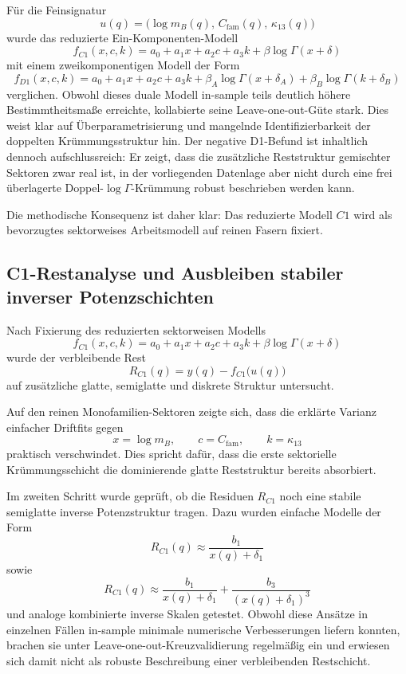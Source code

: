 \documentclass[11pt,a4paper]{article}
\theoremstyle{definition}
\theoremstyle{remark}
\begin{document}
Für die Feinsignatur
\[
u(q)=\bigl(\log m_B(q),\,C_{\mathrm{fam}}(q),\,\kappa_{13}(q)\bigr)
\]
wurde das reduzierte Ein-Komponenten-Modell
\[
f_{C1}(x,c,k)
=
a_0+a_1x+a_2c+a_3k+\beta\log\Gamma(x+\delta)
\]
mit einem zweikomponentigen Modell der Form
\[
f_{D1}(x,c,k)
=
a_0+a_1x+a_2c+a_3k
+\beta_A\log\Gamma(x+\delta_A)
+\beta_B\log\Gamma(k+\delta_B)
\]
verglichen. Obwohl dieses duale Modell in-sample teils deutlich höhere Bestimmtheitsmaße erreichte, kollabierte seine Leave-one-out-Güte stark. Dies weist klar auf Überparametrisierung und mangelnde Identifizierbarkeit der doppelten Krümmungsstruktur hin. Der negative D1-Befund ist inhaltlich dennoch aufschlussreich: Er zeigt, dass die zusätzliche Reststruktur gemischter Sektoren zwar real ist, in der vorliegenden Datenlage aber nicht durch eine frei überlagerte Doppel-\(\log\Gamma\)-Krümmung robust beschrieben werden kann.

Die methodische Konsequenz ist daher klar: Das reduzierte Modell \(C1\) wird als bevorzugtes sektorweises Arbeitsmodell auf reinen Fasern fixiert.

\subsection{C1-Restanalyse und Ausbleiben stabiler inverser Potenzschichten}

Nach Fixierung des reduzierten sektorweisen Modells
\[
f_{C1}(x,c,k)
=
a_0+a_1x+a_2c+a_3k+\beta\log\Gamma(x+\delta)
\]
wurde der verbleibende Rest
\[
R_{C1}(q)=y(q)-f_{C1}\bigl(u(q)\bigr)
\]
auf zusätzliche glatte, semiglatte und diskrete Struktur untersucht.

Auf den reinen Monofamilien-Sektoren zeigte sich, dass die erklärte Varianz einfacher Driftfits gegen
\[
x=\log m_B,\qquad c=C_{\mathrm{fam}},\qquad k=\kappa_{13}
\]
praktisch verschwindet. Dies spricht dafür, dass die erste sektorielle Krümmungsschicht die dominierende glatte Reststruktur bereits absorbiert.

Im zweiten Schritt wurde geprüft, ob die Residuen \(R_{C1}\) noch eine stabile semiglatte inverse Potenzstruktur tragen. Dazu wurden einfache Modelle der Form
\[
R_{C1}(q)\approx \frac{b_1}{x(q)+\delta_1}
\]
sowie
\[
R_{C1}(q)\approx \frac{b_1}{x(q)+\delta_1}+\frac{b_3}{(x(q)+\delta_1)^3}
\]
und analoge kombinierte inverse Skalen getestet. Obwohl diese Ansätze in einzelnen Fällen in-sample minimale numerische Verbesserungen liefern konnten, brachen sie unter Leave-one-out-Kreuzvalidierung regelmäßig ein und erwiesen sich damit nicht als robuste Beschreibung einer verbleibenden Restschicht.
\end{document}
